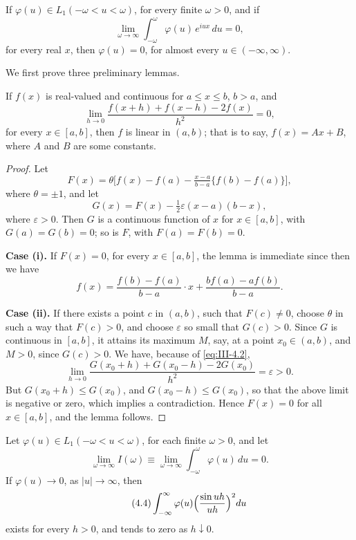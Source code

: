 \begin{theorem}[Offord]\label{thm:III-10}
If $\varphi(u)\in L_{1}(-\omega<u<\omega)$, for every finite $\omega>0$, and if
\begin{equation}\tag{4.1}\label{eq:III-4.1}
\lim_{\omega\to\infty}\int_{-\omega}^{\omega}\varphi(u)\,e^{iux}\,du=0,
\end{equation}
for every real $x$, then $\varphi(u)=0$, for almost every $u\in(-\infty,\infty)$.
\end{theorem}

We first prove three preliminary lemmas.

\begin{lemma}[Schwarz]\label{lem:III-7}
If $f(x)$ is real-valued and continuous for $a\le x\le b$, $b>a$, and
\begin{equation}\tag{4.2}\label{eq:III-4.2}
\lim_{h\to0}\frac{f(x+h)+f(x-h)-2f(x)}{h^{2}}=0,
\end{equation}
for every $x\in[a,b]$, then $f$ is linear in $(a,b)$; that is to say, $f(x)=Ax+B$, where $A$ and $B$ are some constants.
\end{lemma}

\begin{proof}
Let
\[
F(x)=\theta\bigl[f(x)-f(a)-\tfrac{x-a}{b-a}\bigl\{f(b)-f(a)\bigr\}\bigr],
\]
where $\theta=\pm1$, and let
\[
G(x)=F(x)-\tfrac12\varepsilon(x-a)(b-x),
\]
where $\varepsilon>0$. Then $G$ is a continuous function of $x$ for $x\in[a,b]$, with $G(a)=G(b)=0$; so is $F$, with $F(a)=F(b)=0$.

\noindent\textbf{Case (i).} If $F(x)=0$, for every $x\in[a,b]$, the lemma is immediate since then we have
\[
f(x)=\frac{f(b)-f(a)}{b-a}\cdot x+\frac{bf(a)-af(b)}{b-a}.
\]

\noindent\textbf{Case (ii).} If there exists a point $c$ in $(a,b)$, such that $F(c)\neq0$, choose $\theta$ in such a way that $F(c)>0$, and choose $\varepsilon$ so small that $G(c)>0$. Since $G$ is continuous in $[a,b]$, it attains its maximum $M$, say, at a point $x_{0}\in(a,b)$, and $M>0$, since $G(c)>0$. We have, because of \eqref{eq:III-4.2},
\[
\lim_{h\to0}\frac{G(x_{0}+h)+G(x_{0}-h)-2G(x_{0})}{h^{2}}=\varepsilon>0.
\]
But $G(x_{0}+h)\le G(x_{0})$, and $G(x_{0}-h)\le G(x_{0})$, so that the above limit is negative or zero, which implies a contradiction. Hence $F(x)=0$ for all $x\in[a,b]$, and the lemma follows.
\end{proof}

\begin{lemma}\label{lem:III-8}
Let $\varphi(u)\in L_{1}(-\omega<u<\omega)$, for each finite $\omega>0$, and let
\begin{equation}\tag{4.3}\label{eq:III-4.3}
\lim_{\omega\to\infty}I(\omega)\equiv\lim_{\omega\to\infty}\int_{-\omega}^{\omega}\varphi(u)\,du=0.
\end{equation}
If $\varphi(u)\to0$, as $|u|\to\infty$, then
\begin{equation}\tag{4.4}\label{eq:III-4.4}
\int_{-\infty}^{\infty}\varphi(u)\Bigl(\frac{\sin uh}{uh}\Bigr)^{2}du
\end{equation}
exists for every $h>0$, and tends to zero as $h\downarrow0$.
\end{lemma}

